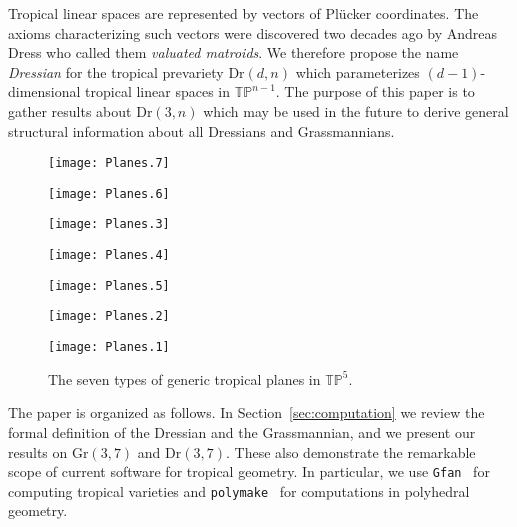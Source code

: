 \documentclass[12pt,a4paper]{amsart}
\theoremstyle{definition}
\newcommand{\Gr}{{\mathrm{Gr}}}
\newcommand{\Dr}{{\mathrm{Dr}}}
\newcommand{\TP}{{\mathbb{TP}}}
\providecommand\Gfan{\texttt{Gfan}\xspace}
\providecommand\polymake{\texttt{polymake}\xspace}
\begin{document}
Tropical linear spaces are represented by vectors of Pl\"ucker
coordinates. The axioms characterizing such vectors were discovered two
decades ago by Andreas Dress who called them \emph{valuated matroids}.  We
therefore propose the name \emph{Dressian} for the tropical prevariety
$\Dr(d,n)$ which parameterizes $(d-1)$-dimensional tropical linear spaces in
$\TP^{n-1}$.  The purpose of this paper is to gather results about $\Dr(3,n)$
which may be used in the future to derive general structural information about
all Dressians and Grassmannians.
\begin{figure}[hp]\centering

  \texttt{[image: Planes.7]}

  \vspace{1.5cm}

  \begin{minipage}[c]{.45\textwidth}\centering
    \texttt{[image: Planes.6]}
  \end{minipage}
  \hfill
  \begin{minipage}[c]{.45\textwidth}\centering
    \texttt{[image: Planes.3]}
  \end{minipage}

  \vspace{1.5cm}
  
  \begin{minipage}[c]{.45\textwidth}\centering
    \texttt{[image: Planes.4]}
  \end{minipage}
  \hfill
  \begin{minipage}[c]{.45\textwidth}\centering
    \texttt{[image: Planes.5]}
  \end{minipage}

  \vspace{1.5cm}

  \begin{minipage}[c]{.45\textwidth}\centering
    \texttt{[image: Planes.2]}
  \end{minipage}
  \hfill
  \begin{minipage}[c]{.45\textwidth}\centering
    \texttt{[image: Planes.1]}
  \end{minipage}
  
  \caption{The seven types of generic tropical planes in $\TP^5$.}
  \label{fig:planes}
\end{figure}

The paper is organized as follows. In Section~\ref{sec:computation} we review
the formal definition of the Dressian and the Grassmannian, and we present our
results on $\Gr(3,7)$ and $\Dr(3,7)$.  These also demonstrate the remarkable
scope of current software for tropical geometry.  In particular, we use
\Gfan~\cite{Gfan} for computing tropical varieties and
\polymake~\cite{polymake} for computations in polyhedral geometry.
\end{document}
